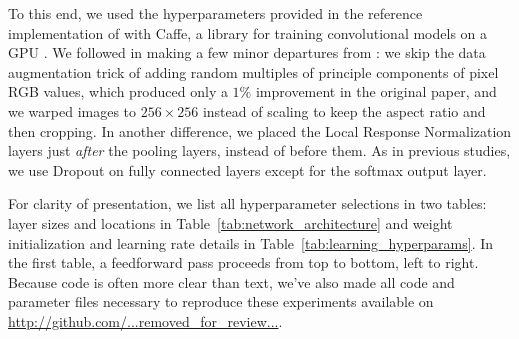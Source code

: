 To this end, we used the hyperparameters provided in the reference implementation of  \cite{Krizhevsky-2012} with Caffe, a library for training convolutional models on a GPU \citep{donahue+jia-2013-arxiv}. We followed \citet{donahue+jia-2013-arxiv} in making a few minor departures from \cite{Krizhevsky-2012}: we skip the data augmentation trick of adding random multiples of principle components of pixel RGB values, which produced only a $1\%$ improvement in the original paper, and we warped images to $256\times 256$ instead of scaling to keep the aspect ratio and then cropping. In another difference, we placed the Local Response Normalization layers just \emph{after} the pooling layers, instead of before them. As in previous studies, we use Dropout \citep{Hinton-et-al-arxiv2012} on fully connected layers except for the softmax output layer.


For clarity of presentation, we list all hyperparameter selections in two tables: layer sizes and locations in Table~\ref{tab:network_architecture} and weight initialization and learning rate details in Table~\ref{tab:learning_hyperparams}. In the first table, a feedforward pass proceeds from top to bottom, left to right. Because code is often more clear than text, we've also made all code and parameter files necessary to reproduce these experiments available on \url{http://github.com/...removed_for_review...}.


